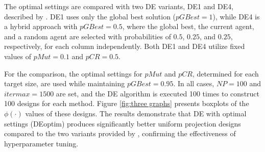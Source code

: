 \documentclass [PhD] {package/uclathes}
\begin{document}
The optimal settings are compared with two DE variants, DE1 and DE4, described by \textcite{stokes2023metaheuristic}. DE1 uses only the global best solution (\( pGBest = 1 \)), while DE4 is a hybrid approach with \( pGBest = 0.5 \), where the global best, the current agent, and a random agent are selected with probabilities of \( 0.5 \), \( 0.25 \), and \( 0.25 \), respectively, for each column independently. Both DE1 and DE4 utilize fixed values of \( pMut = 0.1 \) and \( pCR = 0.5 \).  

For the comparison, the optimal settings for \( pMut\) and \( pCR \), determined for each target size, are used while maintaining \( pGBest = 0.95 \). In all cases, \( NP = 100 \) and \( itermax = 1500 \) are set, and the DE algorithm is executed 100 times to construct 100 designs for each method. Figure \ref{fig:three graphs} presents boxplots of the \( \phi(\cdot) \) values of these designs. The results demonstrate that DE with optimal settings (DEoptim) produces significantly better uniform projection designs compared to the two variants provided by \textcite{stokes2023metaheuristic}, confirming the effectiveness of hyperparameter tuning.
\end{document}
